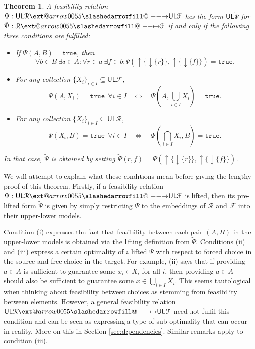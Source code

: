 \documentclass[12pt]{article}
\makeatletter
\theoremstyle{definition}
\theoremstyle{plain}
\theoremstyle{plain}
\theoremstyle{plain}
\newtheorem{theorem}[definition]{Theorem}
\theoremstyle{plain}
\theoremstyle{remark}
\theoremstyle{remark}
\newcommand{\mc}[1]{\mathcal{#1}}
\newcommand{\sub}{\subseteq}
\newcommand{\low}{\mathsf{L}}
\newcommand{\upper}{\mathsf{U}}
\newcommand{\true}{\mathtt{true}}
\newcommand{\upc}[1]{{\uparrow #1}}
\newcommand{\lwc}[1]{{\downarrow #1}}
\def\slashedarrowfill@#1#2#3#4#5{%
	$\m@th\thickmuskip0mu\medmuskip\thickmuskip\thinmuskip\thickmuskip
	\relax#5#1\mkern-7mu%
	\cleaders\hbox{$#5\mkern-2mu#2\mkern-2mu$}\hfill
	\mathclap{#3}\mathclap{#2}%
	\cleaders\hbox{$#5\mkern-2mu#2\mkern-2mu$}\hfill
	\mkern-7mu#4$%
}
\def\rightslashedarrowfill@{%
	\slashedarrowfill@\relbar\relbar\mapstochar\rightarrow}
\newcommand\xslashedrightarrow[2][]{%
	\ext@arrow 0055{\rightslashedarrowfill@}{#1}{#2}}
\makeatother
\begin{document}
\begin{theorem}\label{thm:induction}
	A feasibility relation $\Psi: \upper\low\mc{R} \xslashedrightarrow{} \upper\low\mc{F}$ has the form $\upper\low\tilde\Psi$ for $\tilde\Psi: \mc{R} \xslashedrightarrow{} \mc{F}$ if and only if the following three conditions are fulfilled:
	\begin{itemize}
	\item[(i)] If $\Psi(A,B)=\true$, then
	$$\forall b \in B \: \exists a \in A : \forall r \in a \: \exists f \in b: \Psi(\upc\{\lwc{\{r\}}\},\upc\{\lwc{\{f\}}\})=\true.$$
	\item[(ii)] For any collection $\{X_i\}_{i \in I} \sub \upper\low\mc{F}$,
	$$\Psi(A,X_i) = \true \:\: \forall i \in I \quad \Leftrightarrow \quad \Psi(A,\bigcup_{i \in I} X_i) = \true.$$
	\item[(iii)] For any collection $\{X_i\}_{i \in I} \sub \upper\low\mc{R}$,
	$$\Psi(X_i,B) = \true \:\: \forall i \in I \quad \Leftrightarrow \quad \Psi(\bigcap_{i \in I}X_i,B) = \true.$$
	\end{itemize}
	In that case, $\tilde\Psi$ is obtained by setting $\tilde\Psi(r,f) = \Psi(\upc\{\lwc{\{r\}}\},\upc\{\lwc{\{f\}}\})$.
\end{theorem}

We will attempt to explain what these conditions mean before giving the lengthy proof of this theorem. Firstly, if a feasibility relation $\Psi: \upper\low\mc{R} \xslashedrightarrow{} \upper\low\mc{F}$ is lifted, then its pre-lifted form $\tilde\Psi$ is given by simply restricting $\Psi$ to the embeddings of $\mc{R}$ and $\mc{F}$ into their upper-lower models. 

Condition (i) expresses the fact that feasibility between each pair $(A,B)$ in the upper-lower models is obtained via the lifting definition from $\tilde\Psi$. Conditions (ii) and (iii) express a certain optimality of a lifted $\Psi$ with respect to forced choice in the source and free choice in the target. For example, (ii) says that if providing $a \in A$ is sufficient to guarantee some $x_i \in X_i$ for all $i$, then providing $a \in A$ should also be sufficient to guarantee some $x \in \bigcup_{i \in I} X_i$. This seems tautological when thinking about feasibility between choices as stemming from feasibility between elements. However, a general feasibility relation $\upper\low\mc{R} \xslashedrightarrow{} \upper\low\mc{F}$ need not fulfil this condition and can be seen as expressing a type of sub-optimality that can occur in reality. More on this in Section \ref{sec:dependencies}. Similar remarks apply to condition (iii).
\end{document}
